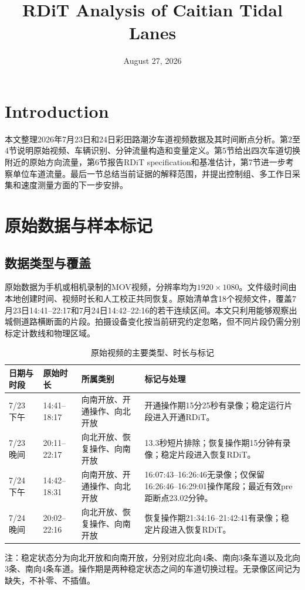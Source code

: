 \documentclass[11pt,a4paper]{ctexart}
\title{RDiT Analysis of Caitian Tidal Lanes}
\author{}
\date{August 27, 2026}
\begin{document}
\maketitle

\section{Introduction}

本文整理2026年7月23日和24日彩田路潮汐车道视频数据及其时间断点分析。第2至4节说明原始视频、车辆识别、分钟流量构造和变量定义。第5节给出四次车道切换附近的原始方向流量，第6节报告RDiT specification和基准估计，第7节进一步考察单位车道流量。最后一节总结当前证据的解释范围，并提出控制组、多工作日采集和速度测量方面的下一步安排。

\section{原始数据与样本标记}

\subsection{数据类型与覆盖}

原始数据为手机或相机录制的MOV视频，分辨率均为$1920\times1080$。文件级时间由本地创建时间、视频时长和人工校正共同恢复。原始清单含18个视频文件，覆盖7月23日14:41--22:17和7月24日14:42--22:16的若干连续区间。本文只利用能够观察出城侧道路横断面的片段。拍摄设备变化按当前研究约定忽略，但不同片段仍需分别标定计数线和物理区域。

\begin{table}[H]
\centering
\caption{原始视频的主要类型、时长与标记}
\label{tab:raw_data}
\begin{threeparttable}
\begin{tabularx}{\textwidth}{p{}p{}p{}X}
\toprule
日期与时段 & 原始时长 & 所属类别 & 标记与处理 \\
\midrule
7/23 下午 & 14:41--18:17 & 向南开放、开通操作、向北开放 & 开通操作期15分25秒有录像；稳定运行片段进入开通RDiT。\\
7/23 晚间 & 20:11--22:17 & 向北开放、恢复操作、向南开放 & 13.3秒短片排除；恢复操作期15分钟有录像；稳定片段进入恢复RDiT。\\
7/24 下午 & 14:42--18:31 & 向南开放、开通操作、向北开放 & 16:07:43--16:26:46无录像；仅保留16:26:46--16:29:01操作尾段；最近有效pre距断点23.02分钟。\\
7/24 晚间 & 20:02--22:16 & 向北开放、恢复操作、向南开放 & 恢复操作期21:34:16--21:42:41有录像；稳定片段进入恢复RDiT。\\
\bottomrule
\end{tabularx}
\begin{tablenotes}[flushleft]\footnotesize
\item 注：稳定状态分为向北开放和向南开放，分别对应北向4条、南向3条车道以及北向3条、南向4条车道。操作期是两种稳定状态之间的车道切换过程。无录像区间记为缺失，不补零、不插值。
\end{tablenotes}
\end{threeparttable}
\end{table}
\end{document}
